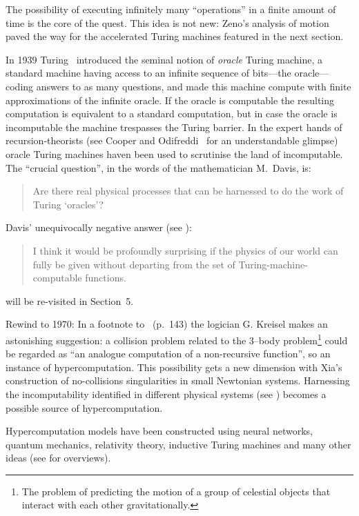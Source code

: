 \documentclass[10pt]{article}
\begin{document}
 The possibility of executing infinitely many ``operations'' in a finite amount of time is the core
 of the quest. This idea is not new:  Zeno's analysis of motion paved the way for the accelerated Turing machines featured in the next section.

 In 1939 Turing~\cite{turing-1939} introduced the seminal notion of {\em oracle} Turing machine, a standard machine having access to an infinite sequence of bits---the oracle---coding answers to as many questions, and made this  machine compute with finite approximations of the infinite oracle. If the oracle
 is computable the resulting computation is equivalent to a standard computation, but in case the oracle is incomputable the machine trespasses the Turing barrier. In the expert hands of recursion-theorists (see Cooper and Odifreddi~\cite{cooper-2003} for an understandable glimpse) oracle Turing machines haven been used to scrutinise the land of incomputable.  The  ``crucial question'', in the words of the mathematician M.~Davis,  is:

 \begin{quote}
Are there real physical  processes that can be harnessed to do the work
of Turing `oracles'? \end{quote}

Davis' unequivocally negative answer (see \cite{Davis-2004,Davis-2006}):

 \begin{quote}
  I think it would be profoundly surprising if the physics of our world can fully be given
without departing from the set of Turing-machine-computable functions.
\end{quote}
will be re-visited
 in Section~5.

 Rewind to 1970:  In a footnote  to~\cite{kreisel-1970} (p.\ 143) the logician G. Kreisel makes an astonishing suggestion:   a collision problem related to the 3--body problem\footnote{The problem of predicting the motion of a group of celestial objects that interact with each other gravitationally. }
 could be regarded as ``an analogue computation of a non-recursive function'', so an instance of hypercomputation. This possibility  gets a new dimension with Xia's~\cite{xia-92}   construction of no-collisions singularities in small Newtonian systems.  Harnessing the incomputability identified  in different physical systems (see \cite{pr1,penrose:90,cooper-2003}) becomes a possible  source of hypercomputation.


   Hypercomputation models have been constructed using neural networks, quantum mechanics,
 relativity theory, inductive Turing machines and many other ideas (see \cite{ord-2006,burgin-2005} for overviews).
\end{document}
